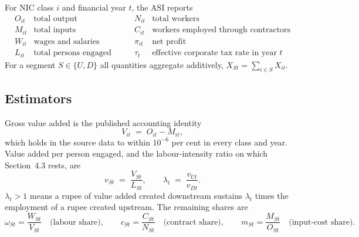 \documentclass[11pt, a4paper]{article}
\numberwithin{figure}{section}
\numberwithin{table}{section}
\begin{document}
For NIC class $i$ and financial year $t$, the ASI reports
\[
\begin{array}{ll}
O_{it} & \text{total output} \\
M_{it} & \text{total inputs} \\
W_{it} & \text{wages and salaries} \\
L_{it} & \text{total persons engaged}
\end{array}
\qquad
\begin{array}{ll}
N_{it} & \text{total workers} \\
C_{it} & \text{workers employed through contractors} \\
\pi_{it} & \text{net profit} \\
\tau_{t} & \text{effective corporate tax rate in year } t
\end{array}
\]
For a segment $S \in \{U, D\}$ all quantities aggregate additively,
$X_{St} = \sum_{i \in S} X_{it}$.

\subsection{Estimators}

Gross value added is the published accounting identity
\begin{equation}
    V_{it} \;=\; O_{it} - M_{it},
    \label{eq:gva}
\end{equation}
which holds in the source data to within $10^{-6}$ per cent in every class and
year. Value added per person engaged, and the labour-intensity ratio on which
Section~4.3 rests, are
\begin{equation}
    v_{St} \;=\; \frac{V_{St}}{L_{St}},
    \qquad
    \lambda_t \;=\; \frac{v_{Ut}}{v_{Dt}} .
    \label{eq:lambda}
\end{equation}
$\lambda_t > 1$ means a rupee of value added created downstream sustains
$\lambda_t$ times the employment of a rupee created upstream. The remaining
shares are
\begin{equation}
    \omega_{St} = \frac{W_{St}}{V_{St}}
    \quad\text{(labour share)},
    \qquad
    c_{St} = \frac{C_{St}}{N_{St}}
    \quad\text{(contract share)},
    \qquad
    m_{St} = \frac{M_{St}}{O_{St}}
    \quad\text{(input-cost share)} .
    \label{eq:shares}
\end{equation}
\end{document}
